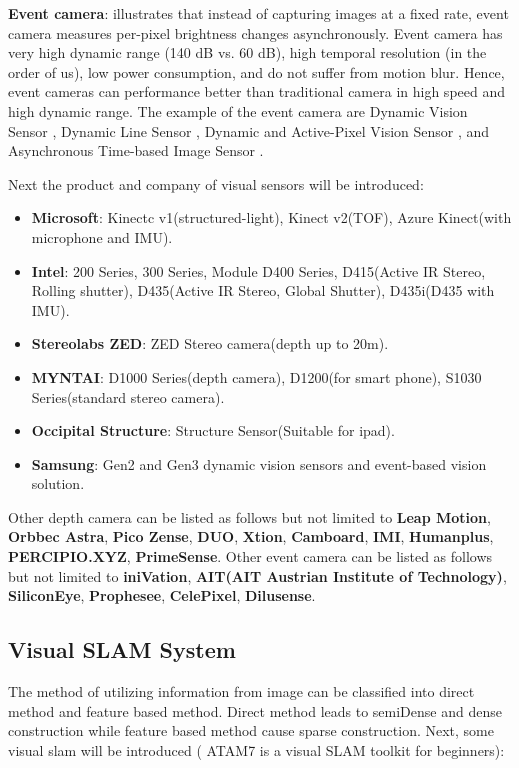\documentclass[journal,transmag]{IEEEtran}
\begin{document}
\textbf{Event camera}: \cite{Gallego2019Event} illustrates that instead of capturing images at a fixed rate, event camera measures per-pixel brightness changes asynchronously. Event camera has very high dynamic range (140 dB vs. 60 dB), high temporal resolution (in the order of us), low power consumption, and do not suffer from motion blur. Hence, event cameras can performance better than traditional camera in high speed and high dynamic range. The example of the event camera are Dynamic Vision Sensor \cite{lichtsteiner2008128}\cite{son20174}\cite{posch2009microbolometer}\cite{hofstatter2010sparc}, Dynamic Line Sensor \cite{posch2007dual}, Dynamic and Active-Pixel Vision Sensor \cite{brandli2014240}, and Asynchronous Time-based Image Sensor \cite{posch2010qvga}.

Next the product and company of visual sensors will be introduced:

\begin{itemize}
    \item \textbf{Microsoft}: Kinectc v1(structured-light), Kinect v2(TOF), Azure Kinect(with microphone and IMU).
    \item \textbf{Intel}: 200 Series, 300 Series, Module D400 Series, D415(Active IR Stereo, Rolling shutter), D435(Active IR Stereo, Global Shutter), D435i(D435 with IMU).
    \item \textbf{Stereolabs ZED}: ZED Stereo camera(depth up to 20m).
    \item \textbf{MYNTAI}: D1000 Series(depth camera), D1200(for smart phone), S1030 Series(standard stereo camera).
    \item \textbf{Occipital Structure}: Structure Sensor(Suitable for ipad).
    \item \textbf{Samsung}: Gen2 and Gen3 dynamic vision sensors and event-based vision solution\cite{son20174}.
\end{itemize}

Other depth camera can be listed as follows but not limited to \textbf{Leap Motion}, \textbf{Orbbec Astra}, \textbf{Pico Zense}, \textbf{DUO}, \textbf{Xtion}, \textbf{Camboard}, \textbf{IMI}, \textbf{Humanplus}, \textbf{PERCIPIO.XYZ}, \textbf{PrimeSense}. Other event camera can be listed as follows but not limited to \textbf{iniVation}, \textbf{AIT(AIT Austrian Institute of Technology)}, \textbf{SiliconEye}, \textbf{Prophesee}, \textbf{CelePixel}, \textbf{Dilusense}.

\subsection{Visual SLAM System}
The method of utilizing information from image can be classified into direct method and feature based method. Direct method leads to semiDense and dense construction while feature based method cause sparse construction. Next, some visual slam will be introduced ( ATAM7 is a visual SLAM toolkit for beginners\cite{taketomi2017visual}): 
\end{document}
